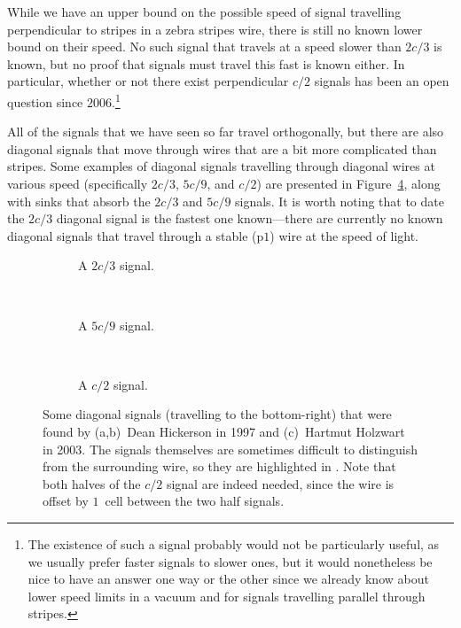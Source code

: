While we have an upper bound on the possible speed of signal travelling perpendicular to stripes in a zebra stripes wire, there is still no known lower bound on their speed. No such signal that travels at a speed slower than $2c/3$ is known, but no proof that signals must travel this fast is known either. In particular, whether or not there exist perpendicular $c/2$ signals has been an open question since $2006$.\footnote{The existence of such a signal probably would not be particularly useful, as we usually prefer faster signals to slower ones, but it would nonetheless be nice to have an answer one way or the other since we already know about lower speed limits in a vacuum and for signals travelling parallel through stripes.}

All of the signals that we have seen so far travel orthogonally, but there are also diagonal signals that move through wires that are a bit more complicated than stripes. Some examples of diagonal signals travelling through diagonal wires at various speed (specifically $2c/3$, $5c/9$, and $c/2$) are presented in Figure~\ref{fig:diagonal_signals}, along with sinks that absorb the $2c/3$ and $5c/9$ signals. It is worth noting that to date the $2c/3$ diagonal signal is the fastest one known---there are currently no known diagonal signals that travel through a stable (p$1$) wire at the speed of light.

\begin{figure}[!htb]
	\centering
	\begin{subfigure}{.31\textwidth}
		\centering{}
		\caption{A $2c/3$ signal.}\label{fig:diagonal_2c3_signal}
	\end{subfigure} \ \ \ \ %
	\begin{subfigure}{.31\textwidth}
		\centering{}
		\caption{A $5c/9$ signal.}\label{fig:diagonal_5c9_signal}
	\end{subfigure} \ \ \ \ %
	\begin{subfigure}{.31\textwidth}
		\centering{}
		\caption{A $c/2$ signal.}\label{fig:diagonal_c2_signal}
	\end{subfigure}
	\caption{Some diagonal signals (travelling to the bottom-right) that were found by (a,b)~Dean Hickerson in 1997 and (c)~Hartmut Holzwart in 2003. The signals themselves are sometimes difficult to distinguish from the surrounding wire, so they are highlighted in . Note that both halves of the $c/2$ signal are indeed needed, since the wire is offset by $1$~cell between the two half signals.}\label{fig:diagonal_signals}
\end{figure}

